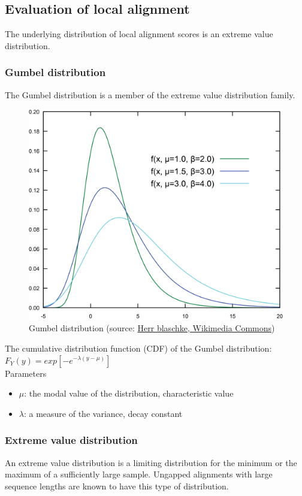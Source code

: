 %
%

%
%
\subsection{Evaluation of local alignment}
The underlying distribution of local alignment scores is an extreme value distribution.

%
%
\subsubsection*{Gumbel distribution} 
The Gumbel distribution is a member of the extreme value distribution family. \\

\begin{figure}[H]
  \centering
      \includegraphics[width=0.4 \textwidth]{fig06/gumbel.png}
  \caption{Gumbel distribution (source: \href{https://commons.wikimedia.org/w/index.php?curid=4787663}{Herr blaschke, Wikimedia Commons})}
\end{figure}

\noindent
The cumulative distribution function (CDF) of the Gumbel distribution: \\

$F_Y(y) = exp⁡[-e^{-\lambda(y-\mu)}]$ \\

\noindent
Parameters
\begin{itemize}
\item $\mu$: the modal value of the distribution, characteristic value
\item $\lambda$: a measure of the variance, decay constant
\end{itemize}

%
%
\subsubsection*{Extreme value distribution}
An extreme value distribution is a limiting distribution for the minimum or the maximum of a sufficiently large sample. Ungapped alignments with large sequence lengths are known to have this type of distribution. \\

